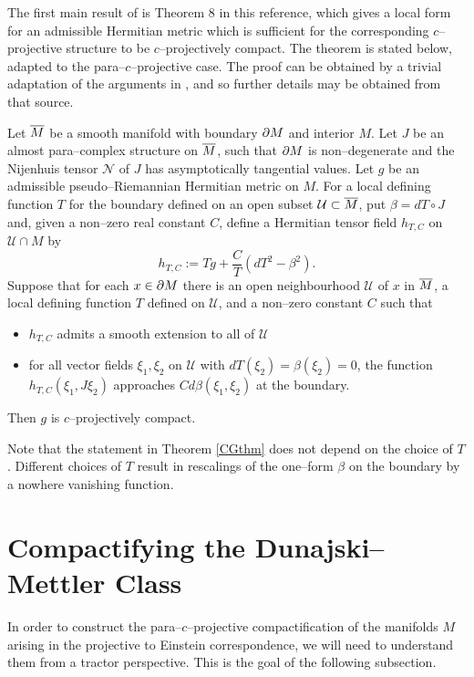 The first main result of \cite{CG} is  Theorem 8 in this reference, which gives a local form for an admissible Hermitian metric which is sufficient for the corresponding $c$--projective structure to be $c$--projectively compact. The theorem is stated below, adapted to the para--$c$--projective case. The proof can be obtained by a trivial adaptation of the arguments in
\cite{CG}, and so further details may be obtained from that source.
\begin{theo}[\cite{CG}] \label{CGthm}
Let $\overline{M}$ be a smooth manifold with boundary $\partial M$ and interior $M$. Let $J$ be an almost para--complex structure on $\overline{M}$, such that $\partial M$ is non--degenerate and the Nijenhuis tensor $\mathcal{N}$ of $J$ has asymptotically tangential values. Let $g$ be an admissible pseudo--Riemannian Hermitian metric on $M$. For a local defining function $T$ for the boundary defined on an open 
subset ${\mathcal U}\subset \overline{M}$, put $\beta=dT\circ J$ and, given a non--zero real 
constant $C$, define a Hermitian tensor field $h_{T,C}$ on 
${\mathcal U}\cap M$ by
\[
h_{T,C}:=Tg+\frac{C}{T}(dT^2-\beta^2).
\]
Suppose that for each $x\in\partial M$ there is an open neighbourhood 
${\mathcal{U}}$ of $x$ in $\overline{M}$, a local defining function $T$ defined on 
${\mathcal{U}}$, and a non--zero constant $C$ such that
\begin{itemize}
\item $h_{T,C}$ admits a smooth extension to all of $\mathcal{U}$
\item for all vector fields $\xi_1,\xi_2$ on $\mathcal{U}$ with $dT(\xi_2)=\beta(\xi_2)=0$, the function $h_{T,C}(\xi_1,J\xi_2)$ approaches $Cd\beta(\xi_1,\xi_2)$ at the boundary.
\end{itemize}
Then $g$ is $c$--projectively compact.
\end{theo}
Note that the statement in  Theorem \ref{CGthm} does not depend on the choice of $T$. Different choices of $T$ result in rescalings of the one--form $\beta$ on the boundary by a nowhere vanishing function.


\section{Compactifying the Dunajski--Mettler Class} 

In order to construct the para--$c$--projective compactification of the manifolds $M$ arising in the projective to Einstein correspondence, we will need to understand them from a tractor perspective. This is the goal of the following subsection.

